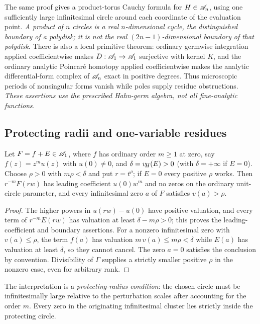 \documentclass[11pt,letterpaper]{article}
\theoremstyle{definition}
\theoremstyle{remark}
\numberwithin{equation}{section}
\begin{document}
The same proof gives a product-torus Cauchy formula for $H\in\mathscr A_n$, using one
sufficiently large infinitesimal circle around each coordinate of the evaluation
point. \emph{A product of $n$ circles is a real $n$-dimensional cycle, the
distinguished boundary of a polydisk; it is not the real $(2n-1)$-dimensional
boundary of that polydisk.} There is also a local primitive theorem: ordinary
germwise integration applied coefficientwise makes $D:\mathscr A_1\to\mathscr A_1$ surjective with
kernel $K$, and the ordinary analytic Poincar\'e homotopy applied coefficientwise
makes the analytic differential-form complex of $\mathscr A_n$ exact in positive degrees.
Thus microscopic periods of nonsingular forms vanish while poles supply residue
obstructions. \emph{These assertions use the prescribed Hahn-germ algebra, not all
fine-analytic functions.}

\subsection{Protecting radii and one-variable residues}
\begin{lemma}
\label{contours:lem:protect}
Let $F=f+E\in\mathscr A_1$, where $f$ has ordinary order $m\ge1$ at zero, say
$f(z)=z^mu(z)$ with $u(0)\ne0$, and $\delta=v_{\!H}(E)>0$ (with $\delta=+\infty$ if
$E=0$). Choose $\rho>0$ with $m\rho<\delta$ and put $r=t^\rho$; if $E=0$ every
positive $\rho$ works. Then $r^{-m}F(rw)$ has leading coefficient $u(0)w^m$ and no
zeros on the ordinary unit-circle parameter, and every infinitesimal zero $a$ of $F$
satisfies $v(a)>\rho$.
\end{lemma}
\begin{proof}
The higher powers in $u(rw)-u(0)$ have positive valuation, and every term of
$r^{-m}E(rw)$ has valuation at least $\delta-m\rho>0$; this proves the
leading-coefficient and boundary assertions. For a nonzero infinitesimal zero with
$v(a)\le\rho$, the term $f(a)$ has valuation $m\,v(a)\le m\rho<\delta$ while $E(a)$
has valuation at least $\delta$, so they cannot cancel. The zero $a=0$ satisfies the
conclusion by convention. Divisibility of $\Gamma$ supplies a strictly smaller
positive $\rho$ in the nonzero case, even for arbitrary rank.
\end{proof}

The interpretation is a \emph{protecting-radius condition}: the chosen circle must
be infinitesimally large relative to the perturbation scales after accounting for
the order $m$. Every zero in the originating infinitesimal cluster lies strictly
inside the protecting circle.
\end{document}
